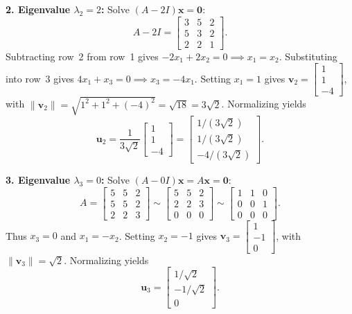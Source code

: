 \documentclass[11pt, letterpaper]{article}
\theoremstyle{definition}
\theoremstyle{remark}
\begin{document}
\textbf{2. Eigenvalue $\lambda_2 = 2$:}
Solve $(A - 2I)\mathbf{x} = \mathbf{0}$:
\[
A - 2I = \begin{bmatrix} 3 & 5 & 2 \\ 5 & 3 & 2 \\ 2 & 2 & 1 \end{bmatrix}.
\]
Subtracting row~2 from row~1 gives $-2x_1 + 2x_2 = 0 \implies x_1 = x_2$. Substituting into row~3 gives $4x_1 + x_3 = 0 \implies x_3 = -4x_1$. Setting $x_1 = 1$ gives $\mathbf{v}_2 = \begin{bmatrix} 1 \\ 1 \\ -4 \end{bmatrix}$, with $\|\mathbf{v}_2\| = \sqrt{1^2 + 1^2 + (-4)^2} = \sqrt{18} = 3\sqrt{2}$. Normalizing yields
\[
\mathbf{u}_2 = \frac{1}{3\sqrt{2}}\begin{bmatrix} 1 \\ 1 \\ -4 \end{bmatrix} = \begin{bmatrix} 1/(3\sqrt{2}) \\ 1/(3\sqrt{2}) \\ -4/(3\sqrt{2}) \end{bmatrix}.
\]

\textbf{3. Eigenvalue $\lambda_3 = 0$:}
Solve $(A - 0I)\mathbf{x} = A\mathbf{x} = \mathbf{0}$:
\[
A = \begin{bmatrix} 5 & 5 & 2 \\ 5 & 5 & 2 \\ 2 & 2 & 3 \end{bmatrix} \sim \begin{bmatrix} 5 & 5 & 2 \\ 2 & 2 & 3 \\ 0 & 0 & 0 \end{bmatrix} \sim \begin{bmatrix} 1 & 1 & 0 \\ 0 & 0 & 1 \\ 0 & 0 & 0 \end{bmatrix}.
\]
Thus $x_3 = 0$ and $x_1 = -x_2$. Setting $x_2 = -1$ gives $\mathbf{v}_3 = \begin{bmatrix} 1 \\ -1 \\ 0 \end{bmatrix}$, with $\|\mathbf{v}_3\| = \sqrt{2}$. Normalizing yields
\[
\mathbf{u}_3 = \begin{bmatrix} 1/\sqrt{2} \\ -1/\sqrt{2} \\ 0 \end{bmatrix}.
\]
\end{document}
